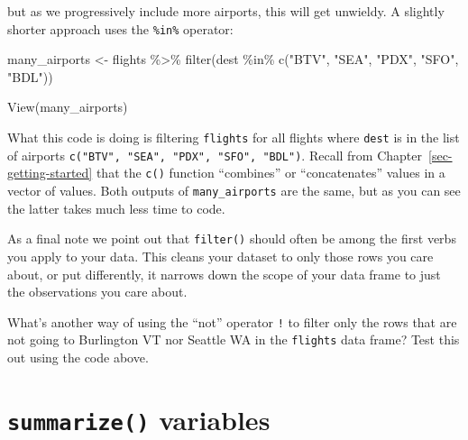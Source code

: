 \documentclass[
  letterpaper,
  DIV=11,
  numbers=noendperiod]{scrreprt}
\newenvironment{Shaded}{\begin{snugshade}}{\end{snugshade}}
\newcommand{\FunctionTok}[1]{\textcolor[rgb]{0.28,0.35,0.67}{#1}}
\newcommand{\NormalTok}[1]{\textcolor[rgb]{0.00,0.23,0.31}{#1}}
\newcommand{\OtherTok}[1]{\textcolor[rgb]{0.00,0.23,0.31}{#1}}
\newcommand{\SpecialCharTok}[1]{\textcolor[rgb]{0.37,0.37,0.37}{#1}}
\newcommand{\StringTok}[1]{\textcolor[rgb]{0.13,0.47,0.30}{#1}}
\theoremstyle{definition}
\theoremstyle{remark}
\begin{document}
but as we progressively include more airports, this will get unwieldy. A
slightly shorter approach uses the \texttt{\%in\%} operator:

\begin{Shaded}
\begin{Highlighting}[]
\NormalTok{many\_airports }\OtherTok{\textless{}{-}}\NormalTok{ flights }\SpecialCharTok{\%\textgreater{}\%} 
  \FunctionTok{filter}\NormalTok{(dest }\SpecialCharTok{\%in\%} \FunctionTok{c}\NormalTok{(}\StringTok{"BTV"}\NormalTok{, }\StringTok{"SEA"}\NormalTok{, }\StringTok{"PDX"}\NormalTok{, }\StringTok{"SFO"}\NormalTok{, }\StringTok{"BDL"}\NormalTok{))}

\FunctionTok{View}\NormalTok{(many\_airports)}
\end{Highlighting}
\end{Shaded}

What this code is doing is filtering \texttt{flights} for all flights
where \texttt{dest} is in the list of airports
\texttt{c("BTV",\ "SEA",\ "PDX",\ "SFO",\ "BDL")}. Recall from
Chapter~\ref{sec-getting-started} that the \texttt{c()} function
``combines'' or ``concatenates'' values in a vector of values. Both
outputs of \texttt{many\_airports} are the same, but as you can see the
latter takes much less time to code.

As a final note we point out that \texttt{filter()} should often be
among the first verbs you apply to your data. This cleans your dataset
to only those rows you care about, or put differently, it narrows down
the scope of your data frame to just the observations you care about.

\begin{tcolorbox}[enhanced jigsaw, colback=white, toprule=.15mm, bottomrule=.15mm, titlerule=0mm, title={{🎯} Learning Check 3.1}, leftrule=.75mm, arc=.35mm, left=2mm, colframe=quarto-callout-tip-color-frame, coltitle=black, opacitybacktitle=0.6, bottomtitle=1mm, colbacktitle=quarto-callout-tip-color!10!white, opacityback=0, toptitle=1mm, rightrule=.15mm, breakable]

What's another way of using the ``not'' operator \texttt{!} to filter
only the rows that are not going to Burlington VT nor Seattle WA in the
\texttt{flights} data frame? Test this out using the code above.

\end{tcolorbox}

\hypertarget{sec-summarize}{%
\section{\texorpdfstring{\texttt{summarize()}
variables}{summarize() variables}}\label{sec-summarize}}
\end{document}
